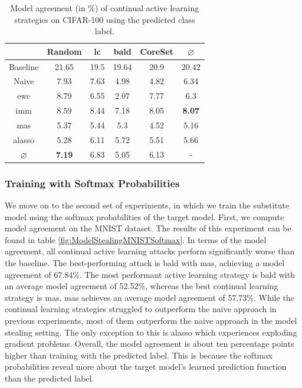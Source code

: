 \begin{table}[h]
    \centering
    \begin{tabular}{ c | c c c c | c } 
         & Random & \gls{lc} & \gls{bald} & CoreSet & $\varnothing$\\ 
        \hline
        Baseline & 21.65 & 19.5 & 19.64 & 20.9 & 20.42\\
        \hline
        Naive & 7.93 & 7.63 & 4.98 & 4.82 & 6.34\\
        \gls{ewc} & 8.79 & 6.55 & 2.07 & 7.77 & 6.3\\
        \gls{imm} & 8.59 & 8.44 & 7.18 & 8.05 & \textbf{8.07}\\
        \gls{mas} & 5.37 & 5.44 & 5.3 & 4.52 & 5.16\\
        \gls{alasso} & 5.28 & 6.11 & 5.72 & 5.51 & 5.66\\
        \hline
        $\varnothing$ & \textbf{7.19} & 6.83 & 5.05 & 6.13 & -\\
    \end{tabular}
    \caption{Model agreement (in \%) of continual active learning strategies on CIFAR-100 using the predicted class label.}
    \label{fig:ModelStealingCIFAR100Label}
\end{table}




\subsubsection{Training with Softmax Probabilities}
\label{sec:Evaluation:MS:Regularization:Softmax}

We move on to the second set of experiments, in which we train the substitute model using the softmax probabilities of the target model. First, we compute model agreement
on the MNIST dataset. The results of this experiment can be found in table \ref{fig:ModelStealingMNISTSoftmax}. In terms of the model agreement, all continual
active learning attacks perform significantly worse than the baseline. The best-performing attack is \gls{bald} with \gls{mas}, achieving a model
agreement of 67.84\%. The most performant active learning strategy is \gls{bald} with an average model agreement of 52.52\%, whereas the best continual learning strategy is
\gls{mas}. \gls{mas} achieves an average model agreement of 57.73\%. While the continual learning strategies struggled to outperform the naive approach in previous experiments,
most of them outperform the naive approach in the model stealing setting. The only exception to this is \gls{alasso} which experiences exploding gradient problems. Overall,
the model agreement is about ten percentage points higher than training with the predicted label. This is because the softmax probabilities reveal more about the target model's
learned prediction function than the predicted label. \par 

